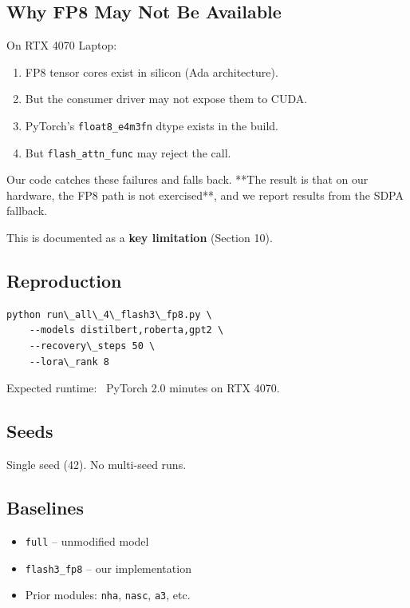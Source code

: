 \subsection{Why FP8 May Not Be Available}

On RTX 4070 Laptop:

\begin{enumerate}
\item FP8 tensor cores exist in silicon (Ada architecture).
\item But the consumer driver may not expose them to CUDA.
\item PyTorch's \texttt{float8\_e4m3fn} dtype exists in the build.
\item But \texttt{flash\_attn\_func} may reject the call.

\end{enumerate}
Our code catches these failures and falls back. **The result is that on 
our hardware, the FP8 path is not exercised**, and we report results from 
the SDPA fallback.

This is documented as a \textbf{key limitation} (Section 10).

\subsection{Reproduction}

\begin{lstlisting}
python run\_all\_4\_flash3\_fp8.py \
    --models distilbert,roberta,gpt2 \
    --recovery\_steps 50 \
    --lora\_rank 8
\end{lstlisting}

Expected runtime: ~PyTorch 2.0 minutes on RTX 4070.

\subsection{Seeds}

Single seed (42). No multi-seed runs.

\subsection{Baselines}

\begin{itemize}
\item \texttt{full} -- unmodified model
\item \texttt{flash3\_fp8} -- our implementation
\item Prior modules: \texttt{nha}, \texttt{nasc}, \texttt{a3}, etc.

\end{itemize}

